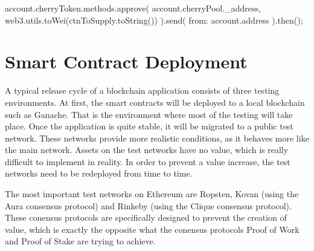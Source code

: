 \begin{GenericCode}
account.cherryToken.methods.approve(
  account.cherryPool._address,
  web3.utils.toWei(ctnToSupply.toString())
).send({ from: account.address }).then();	
\end{GenericCode}


\section{Smart Contract Deployment}
\label{sec:deployment}

A typical release cycle of a blockchain application consists of three testing environments. At first, the smart contracts will be deployed to a local blockchain such as Ganache\cite{Ganache}. That is the environment where most of the testing will take place. Once the application is quite stable, it will be migrated to a public test network. These networks provide more realistic conditions, as it behaves more like the main network. Assets on the test networks have no value, which is really difficult to implement in reality. In order to prevent a value increase, the test networks need to be redeployed from time to time.

The most important test networks on Ethereum are Ropsten, Kovan (using the Aura consensus protocol) and Rinkeby (using the Clique consensus protocol). These conensus protocols are specifically designed to prevent the creation of value, which is exactly the opposite what the conensus protocols Proof of Work and Proof of Stake are trying to achieve.